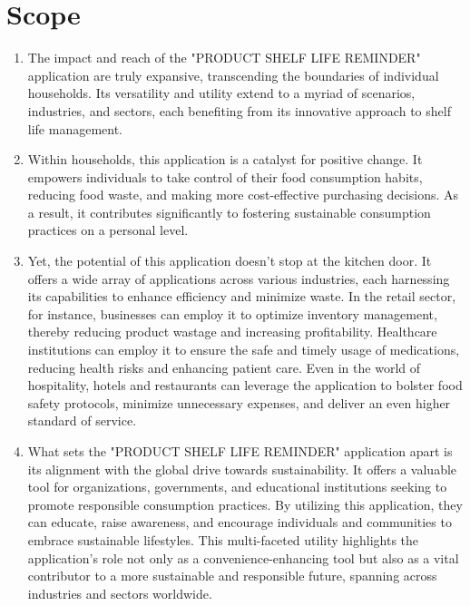 \section{Scope}
\begin{enumerate}
\item[] The impact and reach of the "PRODUCT SHELF LIFE REMINDER" application are truly expansive, transcending the boundaries of individual households. Its versatility and utility extend to a myriad of scenarios, industries, and sectors, each benefiting from its innovative approach to shelf life management.
\item[] \hspace{1cm}Within households, this application is a catalyst for positive change. It empowers individuals to take control of their food consumption habits, reducing food waste, and making more cost-effective purchasing decisions. As a result, it contributes significantly to fostering sustainable consumption practices on a personal level.
\item[] \hspace{1cm}Yet, the potential of this application doesn't stop at the kitchen door. It offers a wide array of applications across various industries, each harnessing its capabilities to enhance efficiency and minimize waste. In the retail sector, for instance, businesses can employ it to optimize inventory management, thereby reducing product wastage and increasing profitability. Healthcare institutions can employ it to ensure the safe and timely usage of medications, reducing health risks and enhancing patient care. Even in the world of hospitality, hotels and restaurants can leverage the application to bolster food safety protocols, minimize unnecessary expenses, and deliver an even higher standard of service.
\item[] \hspace{1cm}What sets the "PRODUCT SHELF LIFE REMINDER" application apart is its alignment with the global drive towards sustainability. It offers a valuable tool for organizations, governments, and educational institutions seeking to promote responsible consumption practices. By utilizing this application, they can educate, raise awareness, and encourage individuals and communities to embrace sustainable lifestyles. This multi-faceted utility highlights the application's role not only as a convenience-enhancing tool but also as a vital contributor to a more sustainable and responsible future, spanning across industries and sectors worldwide.
\end{enumerate}

